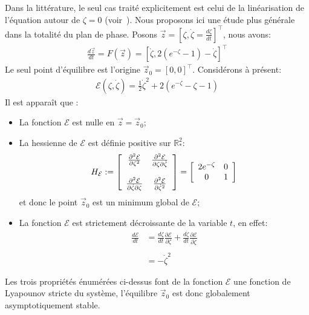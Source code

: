 Dans la littérature, le seul cas traité explicitement est celui de la linéarisation de l'équation autour de $\zeta=0$
(voir~\citet{chandra39}).
Nous proposons ici une étude plus générale dans la totalité du plan de phase. Posons $\vec{z}=\left[
\zeta,\dot{\zeta}=\frac{d\zeta}{dt}\right]^{\top}$, nous avons:
\begin{align}
\frac{d\vec{z}}{dt} =F\left(  \vec{z}\right)  =
\left[\dot{\zeta},2\left(  e^{-\zeta}-1\right)-\dot{\zeta}\right]^{\top} \label{sysdif}%
\end{align}
Le seul point d'équilibre est l'origine $\vec{z}_0=\left[  0,0\right]
^{\top}$. Considérons à présent:
\begin{align*}
\mathcal{E}(\zeta,\dot{\zeta}) = \frac{1}{2}\dot{\zeta}^2+2(e^{-\zeta}-\zeta-1)
\end{align*}
Il est apparaît que :
\begin{itemize}
	\item La fonction $\mathcal{E}$ est nulle en $\vec{z}=\vec{z}_0$;
	\item La hessienne de $\mathcal{E}$ est définie positive sur $\mathbb{R}^2_*$: 
		\begin{align*}
			H_{\mathcal{E}}:=
			\left[
				\begin{array}[c]{cc}%
					\frac{\partial^2 \mathcal{E}}{\partial \zeta^2}         & \frac{\partial^2 \mathcal{E}}{\partial \zeta \partial \dot{\zeta}}\\
					 & \\
					\frac{\partial^2 \mathcal{E}}{\partial \dot{\zeta} \partial \zeta}& \frac{\partial^2 \mathcal{E}}{\partial \dot{\zeta}^2}
				\end{array}
				\right]
				=\left[\begin{array}[c]{cc}%
					2e^{-\zeta}         & 0\\
					0& 1
				\end{array}
				\right]
		\end{align*}
		et donc le point $\vec{z}_0$ est un minimum global de $\mathcal{E}$;
	\item La fonction $\mathcal{E}$ est strictement décroissante de la variable $t$, en effet:
		\begin{align*}
			\frac{d\mathcal{E}}{dt}&=\frac{d\zeta}{dt}\frac{\partial \mathcal{E}}{\partial \zeta}+\frac{d\dot{\zeta}}{dt}\frac{\partial \mathcal{E}}{\partial \dot{\zeta}} \\
			\\
			&=-\dot{\zeta}^2 
		\end{align*}

\end{itemize}
Les trois propriétés énumérées ci-dessus font de la fonction $\mathcal{E}$ une fonction de Lyapounov stricte du système, l'équilibre $\vec{z}_0$ est donc globalement asymptotiquement stable. 

